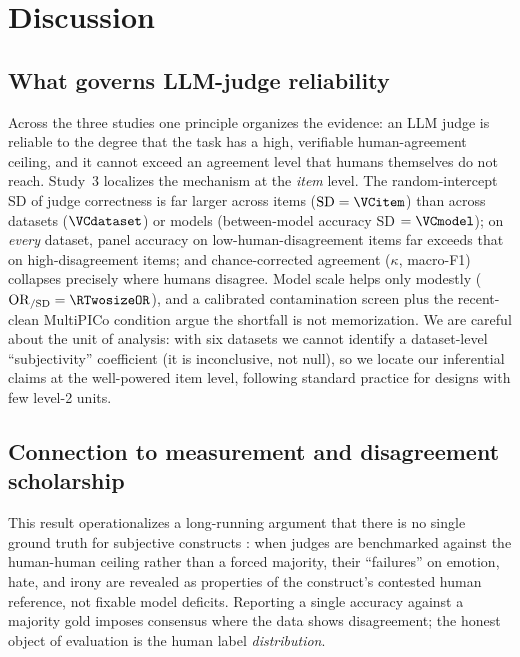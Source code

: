 \section{Discussion}
\subsection{What governs LLM-judge reliability}
Across the three studies one principle organizes the evidence: an LLM judge is reliable to the degree that the task
has a high, verifiable human-agreement ceiling, and it cannot exceed an agreement level that humans themselves do
not reach. Study~3 localizes the mechanism at the \emph{item} level. The random-intercept SD of judge correctness is
far larger across items ($\mathrm{SD}=\VCitem$) than across datasets ($\VCdataset$) or models (between-model
accuracy SD $=\VCmodel$); on \emph{every} dataset, panel accuracy on low-human-disagreement items far exceeds that on
high-disagreement items; and chance-corrected agreement ($\kappa$, macro-F1) collapses precisely where humans
disagree. Model scale helps only modestly ($\mathrm{OR}_{/\mathrm{SD}}=\RTwosizeOR$), and a calibrated contamination
screen plus the recent-clean MultiPICo condition argue the shortfall is not memorization. We are careful about the
unit of analysis: with six datasets we cannot identify a dataset-level ``subjectivity'' coefficient (it is
inconclusive, not null), so we locate our inferential claims at the well-powered item level, following standard
practice for designs with few level-2 units.

\subsection{Connection to measurement and disagreement scholarship}
This result operationalizes a long-running argument that there is no single ground truth for subjective constructs
\citep{aroyo2015truth,plank2022humanlabel}: when judges are benchmarked against the human-human ceiling rather than a
forced majority, their ``failures'' on emotion, hate, and irony are revealed as properties of the construct's
contested human reference, not fixable model deficits. Reporting a single accuracy against a majority gold imposes
consensus where the data shows disagreement; the honest object of evaluation is the human label \emph{distribution}.

